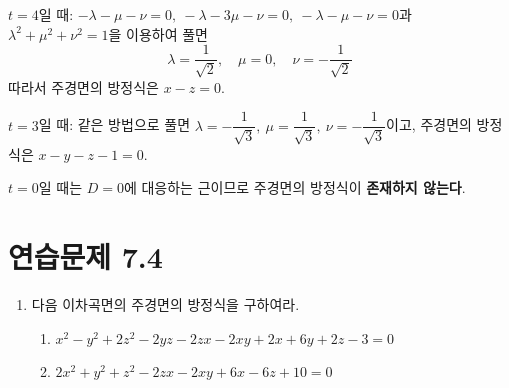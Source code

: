 \documentclass{article}
\theoremstyle{mystyle}
\begin{document}
\(t=4\)일 때: \(-\lambda-\mu-\nu=0,\ -\lambda-3\mu-\nu=0,\ -\lambda-\mu-\nu=0\)과 \(\lambda^2+\mu^2+\nu^2=1\)을 이용하여 풀면
\[
\lambda=\frac{1}{\sqrt2},\quad \mu=0,\quad \nu=-\frac{1}{\sqrt2}
\]
따라서 주경면의 방정식은 \(x-z=0\).

\(t=3\)일 때: 같은 방법으로 풀면 \(\lambda=-\dfrac{1}{\sqrt3},\ \mu=\dfrac{1}{\sqrt3},\ \nu=-\dfrac{1}{\sqrt3}\)이고, 주경면의 방정식은 \(x-y-z-1=0\).

\(t=0\)일 때는 \(D=0\)에 대응하는 근이므로 주경면의 방정식이 \textbf{존재하지 않는다}.

\section*{연습문제 7.4}
\begin{enumerate}
    \item 다음 이차곡면의 주경면의 방정식을 구하여라.
    \begin{enumerate}
        \item[(1)] \(x^2-y^2+2z^2-2yz-2zx-2xy+2x+6y+2z-3=0\)
        \item[(2)] \(2x^2+y^2+z^2-2zx-2xy+6x-6z+10=0\)
    \end{enumerate}
\end{enumerate}
\end{document}
